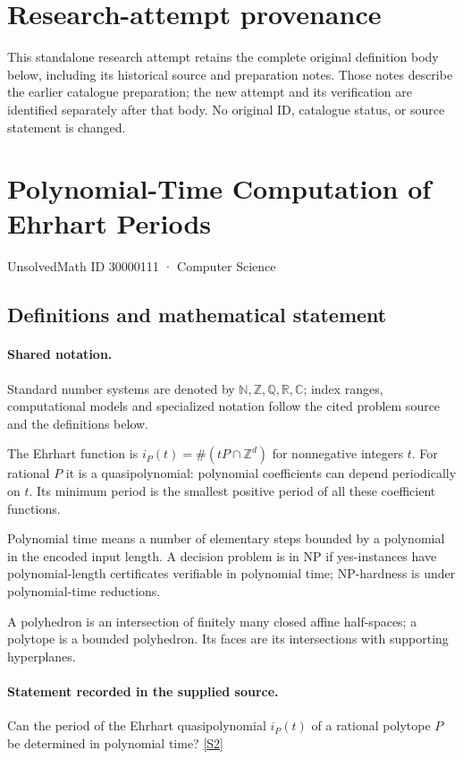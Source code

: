 \documentclass[11pt]{article}
\begin{document}
\section*{Research-attempt provenance}
This standalone research attempt retains the complete original definition body below,
including its historical source and preparation notes. Those notes describe the
earlier catalogue preparation; the new attempt and its verification are identified
separately after that body. No original ID, catalogue status, or source statement is changed.

\section{Polynomial-Time Computation of Ehrhart Periods}\label{30000111}
{\small UnsolvedMath ID 30000111 · Computer Science}
\subsection{Definitions and mathematical statement}

\paragraph{Shared notation.}Standard number systems are denoted by $\mathbb N,\mathbb Z,\mathbb Q,\mathbb R,\mathbb C$; index ranges, computational models and specialized notation follow the cited problem source and the definitions below.


The Ehrhart function is $i_P(t)=\#(tP\cap\mathbb Z^d)$ for nonnegative integers $t$. For rational $P$ it is a quasipolynomial: polynomial coefficients can depend periodically on $t$. Its minimum period is the smallest positive period of all these coefficient functions.

Polynomial time means a number of elementary steps bounded by a polynomial in the encoded input length. A decision problem is in $\mathrm{NP}$ if yes-instances have polynomial-length certificates verifiable in polynomial time; NP-hardness is under polynomial-time reductions.

A polyhedron is an intersection of finitely many closed affine half-spaces; a polytope is a bounded polyhedron. Its faces are its intersections with supporting hyperplanes.
\paragraph{Statement recorded in the supplied source.}
Can the period of the Ehrhart quasipolynomial $i_P(t)$ of a rational polytope $P$ be determined in polynomial time? \href{https://doi.org/10.4171/owr/2004/39}{[S2]}
\end{document}
